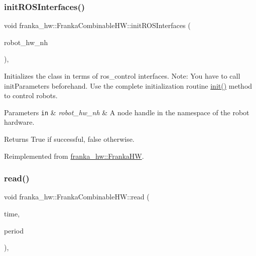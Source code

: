 \subsubsection{\texorpdfstring{init\+R\+O\+S\+Interfaces()}{initROSInterfaces()}}
{\footnotesize\ttfamily void franka\+\_\+hw\+::\+Franka\+Combinable\+H\+W\+::init\+R\+O\+S\+Interfaces (\begin{DoxyParamCaption}\item[{ros\+::\+Node\+Handle \&}]{robot\+\_\+hw\+\_\+nh }\end{DoxyParamCaption})\hspace{0.3cm}{\ttfamily [override]}, {\ttfamily [virtual]}}

Initializes the class in terms of ros\+\_\+control interfaces. Note\+: You have to call init\+Parameters beforehand. Use the complete initialization routine \hyperlink{classfranka__hw_1_1_franka_h_w_a0323c9d759de8d6ab8fae4bf574e4a48}{init()} method to control robots.


\begin{DoxyParams}[1]{Parameters}
\mbox{\tt in}  & {\em robot\+\_\+hw\+\_\+nh} & A node handle in the namespace of the robot hardware. \\
\hline
\end{DoxyParams}
\begin{DoxyReturn}{Returns}
True if successful, false otherwise. 
\end{DoxyReturn}


Reimplemented from \hyperlink{classfranka__hw_1_1_franka_h_w_ae2775ed9705ec3d1d3e58aea2ce21bde}{franka\+\_\+hw\+::\+Franka\+HW}.

\mbox{\label{classfranka__hw_1_1_franka_combinable_h_w_a44e3093eb876aef71423c4f5142c7ed8}} 
\subsubsection{\texorpdfstring{read()}{read()}}
{\footnotesize\ttfamily void franka\+\_\+hw\+::\+Franka\+Combinable\+H\+W\+::read (\begin{DoxyParamCaption}\item[{const ros\+::\+Time \&}]{time,  }\item[{const ros\+::\+Duration \&}]{period }\end{DoxyParamCaption})\hspace{0.3cm}{\ttfamily [override]}, {\ttfamily [virtual]}}

